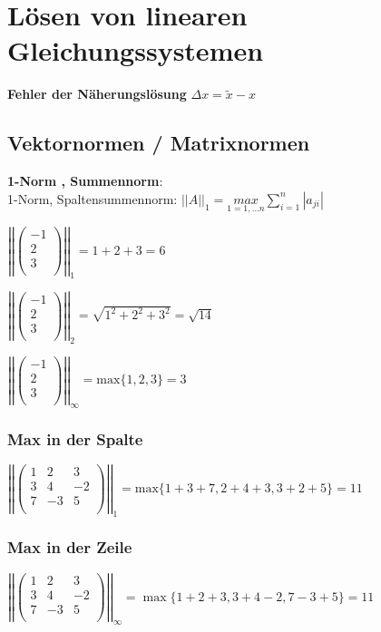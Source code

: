 \documentclass{article}
\begin{document}
\section{Lösen von linearen Gleichungssystemen}

\textbf{Fehler der Näherungslösung}
$ \Delta x = \tilde{x} - x $

\subsection{Vektornormen / Matrixnormen}

\textbf{1-Norm , Summennorm}: \\
1-Norm, Spaltensummennorm: $||A||_1 = \underset{1=1,...n}{max} \sum_{i=1}^{n} |a_{ji} |$


$
\left|
\left|
\begin{pmatrix}
-1 \\
2 \\
3 \\
\end{pmatrix}
\right|
\right|
_1
=
1+2+3=6
$

$
\left|
\left|
\begin{pmatrix}
-1 \\
2 \\
3 \\
\end{pmatrix}
\right|
\right|
_2
=
\sqrt{1^2+2^2+3^2}= \sqrt{14}
$

$
\left|
\left|
\begin{pmatrix}
-1 \\
2 \\
3 \\
\end{pmatrix}
\right|
\right|
_{\infty}
=
\text{max} \{ 1,2,3 \} =3
$

\subsubsection{Max in der Spalte}

$
\left|
\left|
\begin{pmatrix}
1 & 2 & 3 \\
3 & 4 & -2 \\
7 & -3 & 5 \\
\end{pmatrix}
\right|
\right|
_1
=
\text{max} \{1+3+7, 2+4+3, 3+2+5 \} = 11
$


\subsubsection{Max in der Zeile}

$
\left|
\left|
\begin{pmatrix}
1 & 2 & 3 \\
3 & 4 & -2 \\
7 & -3 & 5 \\
\end{pmatrix}
\right|
\right|
_{\infty}
=
\max \{1+2+3, 3+4-2, 7-3+5 \} = 11
$
\end{document}
